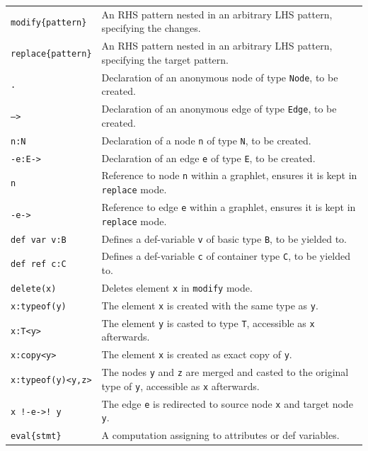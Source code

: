 \begin{table}[htbp]
\begin{minipage}{\linewidth} \renewcommand{\footnoterule}{} 
\begin{tabularx}{\linewidth}{|lX|}
\hline
\texttt{modify\{pattern\}}	& An RHS pattern nested in an arbitrary LHS pattern, specifying the changes. \\
\texttt{replace\{pattern\}}	& An RHS pattern nested in an arbitrary LHS pattern, specifying the target pattern. \\
\hline
\texttt{.}	& Declaration of an anonymous node of type \texttt{Node}, to be created. \\
\texttt{-->}	& Declaration of an anonymous edge of type \texttt{Edge}, to be created. \\
\texttt{n:N} & Declaration of a node \texttt{n} of type \texttt{N}, to be created.\\
\texttt{-e:E->} & Declaration of an edge \texttt{e} of type \texttt{E}, to be created.\\
\texttt{n} & Reference to node \texttt{n} within a graphlet, ensures it is kept in \texttt{replace} mode.\\
\texttt{-e->} & Reference to edge \texttt{e} within a graphlet, ensures it is kept in \texttt{replace} mode.\\
\texttt{def var v:B}	& Defines a def-variable \texttt{v} of basic type \texttt{B}, to be yielded to.\\
\texttt{def ref c:C}	& Defines a def-variable \texttt{c} of container type \texttt{C}, to be yielded to.\\
\texttt{delete(x)} & Deletes element \texttt{x} in \texttt{modify} mode.\\
\hline
\texttt{x:typeof(y)} & The element \texttt{x} is created with the same type as \texttt{y}.\\
\texttt{x:T<y>} & The element \texttt{y} is casted to type \texttt{T}, accessible as \texttt{x} afterwards.\\
\texttt{x:copy<y>} & The element \texttt{x} is created as exact copy of \texttt{y}.\\
\texttt{x:typeof(y)<y,z>} & The nodes \texttt{y} and \texttt{z} are merged and casted to the original type of \texttt{y}, accessible as \texttt{x} afterwards.\\
\texttt{x !-e->! y} & The edge \texttt{e} is redirected to source node \texttt{x} and target node \texttt{y}.\\
\hline
\texttt{eval\{stmt\}} & A computation assigning to attributes or def variables.\\

\end{tabularx}
\end{minipage}
\end{table}

